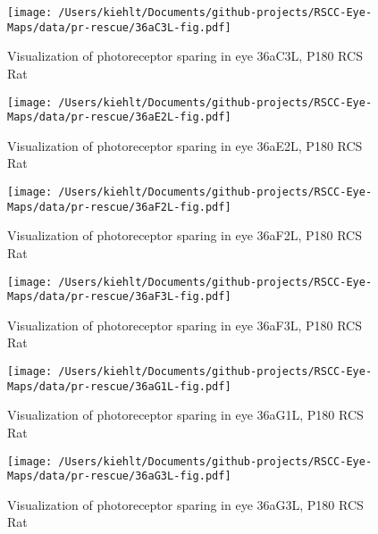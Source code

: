 \documentclass{article}
\begin{document}
\begin{center}
\begin{figure}
\texttt{[image: /Users/kiehlt/Documents/github-projects/RSCC-Eye-Maps/data/pr-rescue/36aC3L-fig.pdf]}
\caption{Visualization of photoreceptor sparing in eye 36aC3L, P180 RCS Rat}
\label{fig:36aC3L}
\end{figure}

\end{center}
\begin{center}
\begin{figure}
\texttt{[image: /Users/kiehlt/Documents/github-projects/RSCC-Eye-Maps/data/pr-rescue/36aE2L-fig.pdf]}
\caption{Visualization of photoreceptor sparing in eye 36aE2L, P180 RCS Rat}
\label{fig:36aE2L}
\end{figure}

\end{center}
\begin{center}
\begin{figure}
\texttt{[image: /Users/kiehlt/Documents/github-projects/RSCC-Eye-Maps/data/pr-rescue/36aF2L-fig.pdf]}
\caption{Visualization of photoreceptor sparing in eye 36aF2L, P180 RCS Rat}
\label{fig:36aF2L}
\end{figure}

\end{center}
\begin{center}
\begin{figure}
\texttt{[image: /Users/kiehlt/Documents/github-projects/RSCC-Eye-Maps/data/pr-rescue/36aF3L-fig.pdf]}
\caption{Visualization of photoreceptor sparing in eye 36aF3L, P180 RCS Rat}
\label{fig:36aF3L}
\end{figure}

\end{center}
\begin{center}
\begin{figure}
\texttt{[image: /Users/kiehlt/Documents/github-projects/RSCC-Eye-Maps/data/pr-rescue/36aG1L-fig.pdf]}
\caption{Visualization of photoreceptor sparing in eye 36aG1L, P180 RCS Rat}
\label{fig:36aG1L}
\end{figure}

\end{center}
\begin{center}
\begin{figure}
\texttt{[image: /Users/kiehlt/Documents/github-projects/RSCC-Eye-Maps/data/pr-rescue/36aG3L-fig.pdf]}
\caption{Visualization of photoreceptor sparing in eye 36aG3L, P180 RCS Rat}
\label{fig:36aG3L}
\end{figure}

\end{center}
\end{document}
